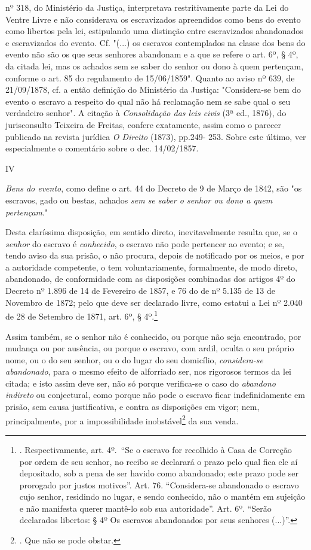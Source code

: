 {  nº 318, do Ministério da Justiça, interpretava restritivamente parte
  da Lei do Ventre Livre e não considerava os escravizados apreendidos
  como bens do evento como libertos pela lei, estipulando uma distinção
  entre escravizados abandonados e escravizados do evento. Cf. "(...) os
  escravos contemplados na classe dos bens do evento não são os que seus
  senhores abandonam e a que se refere o art. 6º, § 4º, da citada lei,
  mas os achados sem se saber do senhor ou dono à quem pertençam,
  conforme o art. 85 do regulamento de 15/06/1859". Quanto ao aviso nº
  639, de 21/09/1878, cf. a então definição do Ministério da Justiça:
  "Considera-se bem do evento o escravo a respeito do qual não há
  reclamação nem se sabe qual o seu verdadeiro senhor". A citação à
  \emph{Consolidação das leis civis} (3ª ed., 1876), do jurisconsulto
  Teixeira de Freitas, confere exatamente, assim como o parecer
  publicado na revista jurídica \emph{O Direito} (1873), pp.249- 253.
  Sobre este último, ver especialmente o comentário sobre o dec.
  14/02/1857.}

IV

\emph{Bens do evento}, como define o art. 44 do Decreto de 9 de Março de
1842, são "os escravos, gado ou bestas, achados \emph{sem se saber o
senhor ou dono a quem pertençam}."

Desta claríssima disposição, em sentido direto, inevitavelmente resulta
que, se o \emph{senhor} do escravo é \emph{conhecido}, o escravo não
pode pertencer ao evento; e se, tendo aviso da sua prisão, o não
procura, depois de notificado por os meios, e por a autoridade
competente, o tem voluntariamente, formalmente, de modo direto,
abandonado, de conformidade com as disposições combinadas dos artigos 4º
do Decreto nº 1.896 de 14 de Fevereiro de 1857, e 76 do de nº 5.135 de
13 de Novembro de 1872; pelo que deve ser declarado livre, como estatui
a Lei nº 2.040 de 28 de Setembro de 1871, art. 6º, § 4º.\footnote{.
  Respectivamente, art. 4º.~``Se o escravo for recolhido à Casa de
  Correção por ordem de seu senhor, no recibo se declarará o prazo pelo
  qual fica ele aí depositado, sob a pena de ser havido como abandonado;
  este prazo pode ser prorogado por justos motivos''. Art. 76.
  ``Considera-se abandonado o escravo cujo senhor, residindo no lugar, e
  sendo conhecido, não o mantém em sujeição e não manifesta querer
  mantê-lo sob sua autoridade''. Art. 6º. ``Serão declarados libertos: §
  4º Os escravos abandonados por seus senhores (...)''.}

Assim também, se o senhor não é conhecido, ou porque não seja
encontrado, por mudança ou por ausência, ou porque o escravo, com ardil,
oculta o seu próprio nome, ou o do seu senhor, ou o do lugar do seu
domicílio, \emph{considera-se abandonado}, para o mesmo efeito de
alforriado ser, nos rigorosos termos da lei citada; e isto assim deve
ser, não só porque verifica-se o caso do \emph{abandono indireto} ou
conjectural, como porque não pode o escravo ficar indefinidamente em
prisão, sem causa justificativa, e contra as disposições em vigor; nem,
principalmente, por a impossibilidade inobstável\footnote{. Que não se
  pode obstar.} da sua venda.

